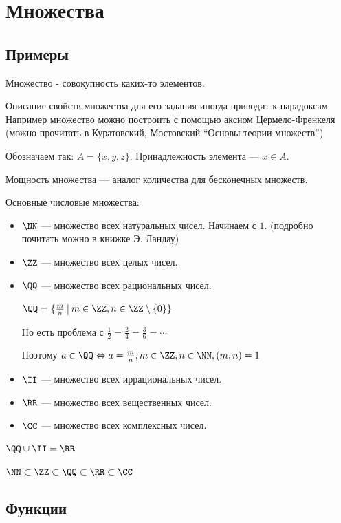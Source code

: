 \section{Множества}

\subsection{Примеры}

Множество - совокупность каких-то элементов.

Описание свойств множества для его задания иногда приводит к парадоксам.
Например множество можно построить с помощью аксиом Цермело-Френкеля
(можно прочитать в Куратовский, Мостовский ``Основы теории множеств'')

Обозначаем так: \( A = \{ x, y, z \} \). Принадлежность элемента --- \( x \in A \).

Мощность множества --- аналог количества для бесконечных множеств.

Основные числовые множества:
\begin{itemize}
    \item
        \( \NN \) --- множество всех натуральных чисел. Начинаем с \( 1 \). (подробно почитать можно в книжке Э. Ландау)
    \item
        \( \ZZ \) --- множество всех целых чисел.
    \item
        \( \QQ \) --- множество всех рациональных чисел.

        \( \QQ = \{ \frac{m}{n} \ \vline \ m \in \ZZ, n \in \ZZ \setminus \{0\} \} \)

        Но есть проблема с \( \frac{1}{2} = \frac{2}{4} = \frac{3}{6} = \cdots \)

        Поэтому \(a \in \QQ \Leftrightarrow a = \frac{m}{n}, m \in \ZZ, n \in \NN, (m, n) = 1 \)
    \item
        \( \II \) --- множество всех иррациональных чисел.
    \item
        \( \RR \) --- множество всех вещественных чисел.
    \item
        \( \CC \) --- множество всех комплексных чисел.
\end{itemize}

\( \QQ \cup \II = \RR \)

\( \NN \subset \ZZ \subset \QQ \subset \RR \subset \CC \)

\subsection{Функции}

